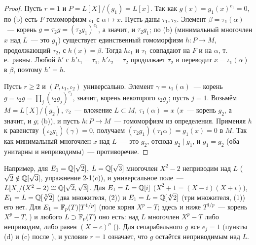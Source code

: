 \begin{proof}
Пусть $r=1$ и $P=L[X]/(g_1)=L[x]$. Так как $g(x)=g_1(x)^{e_1}=0$, по (b) есть $F$-гомоморфизм $\iota_1$ с
$\alpha\mapsto x$. Пусть даны $\tau_1,\tau_2$. Элемент $\beta=\tau_1(\alpha)$~--- корень $g=\tau_2g=(\tau_2g_1)^{e_1}$, а
значит, и $\tau_2g_1$; по (b) (минимальный многочлен $x$ над $L$~--- это $g_1$) существует единственный
гомоморфизм $h\colon P\to M$, продолжающий $\tau_2$, с $h(x)=\beta$. Тогда $h\iota_1$ и $\tau_1$ совпадают на $F$ и на
$\alpha$, т.\,е.\ равны. Любой $h'$ с $h'\iota_1=\tau_1$, $h'\iota_2=\tau_2$ продолжает $\tau_2$ и переводит $x=\iota_1(\alpha)$ в
$\beta$, поэтому $h'=h$.

Пусть $r\ge2$ и $(P,\iota_1,\iota_2)$ универсально. Элемент $\gamma=\iota_1(\alpha)$~--- корень
$g=\iota_2g=\prod_j(\iota_2g_j)^{e_j}$, значит, корень некоторого $\iota_2g_j$; пусть $j=1$. Возьмём $M=L[X]/(g_2)$,
$\tau_2$~--- вложение $L\subset M$, $\tau_1(\alpha)=x$ ($x$~--- корень $g_2$, а значит, и $g$; (b)), и пусть
$h\colon P\to M$~--- гомоморфизм из определения. Применяя $h$ к равенству $(\iota_2g_1)(\gamma)=0$, получаем
$(\tau_2g_1)(\tau_1\alpha)=g_1(x)=0$ в $M$. Так как минимальный многочлен $x$ над $L$~--- это $g_2$, отсюда $g_2\mid g_1$, и
$g_1=g_2$ (оба унитарны и неприводимы)~--- противоречие.
\end{proof}

Например, для $E_1=\mathbb Q[\sqrt2]$, $L=\mathbb Q[\sqrt3]$ многочлен $X^2-2$ неприводим над $L$ ($\sqrt2\notin\mathbb Q[\sqrt3]$, упражнение
2-1(c)), и универсальное поле~--- $L[X]/(X^2-2)\cong\mathbb Q[\sqrt2,\sqrt3]$. Для $E_1=L=\mathbb Q[i]$ ($X^2+1=(X-i)(X+i)$),
$E_1=L=\mathbb Q[\sqrt[3]2]$ (два множителя, (2)) и $E_1=L=\mathbb Q[\sqrt[4]2]$ (три множителя, (1)) его нет. Для
$E_1=\mathbb F_p(T)[T^{1/p}]$ (поле корня $X^p-T$; здесь и ниже $T^{1/p}$~--- корень $X^p-T$, ) и любого
$L\supset\mathbb F_p(T)$ оно есть: над $L$ многочлен $X^p-T$ либо неприводим, либо равен $(X-c)^p$
(). Для сепарабельного $g$ все $e_j=1$ (пункты (d) и (c) после ), и условие $r=1$ означает, что $g$ остаётся неприводимым
над $L$.

